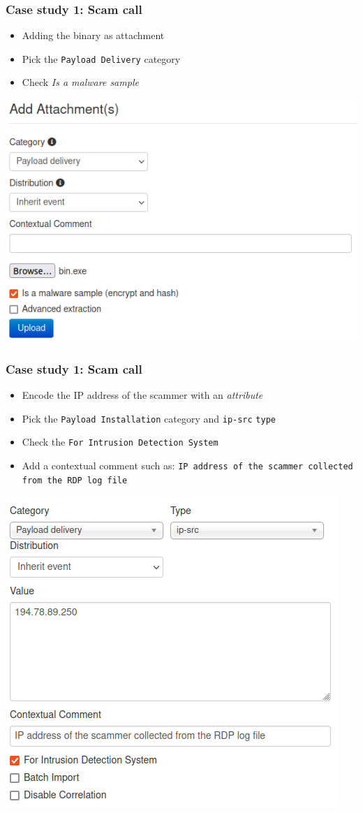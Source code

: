 \begin{frame}
    \frametitle{Case study 1: Scam call}
    \begin{itemize}
        \item Adding the binary as attachment
        \item Pick the \texttt{Payload Delivery} category
        \item Check \textit{Is a malware sample}
    \end{itemize}
    \begin{center}
        \includegraphics[width=0.80\linewidth]{pictures/case1/attribute-bin.png}
    \end{center}
\end{frame}

\begin{frame}
    \frametitle{Case study 1: Scam call}
    \begin{itemize}
        \item Encode the IP address of the scammer with an \textit{attribute}
        \item Pick the \texttt{Payload Installation} category and \texttt{ip-src}  \texttt{type}
        \item Check the \texttt{For Intrusion Detection System}
        \item Add a contextual comment such as: \texttt{IP address of the scammer collected from the RDP log file}
    \end{itemize}
    \begin{center}
        \includegraphics[width=0.70\linewidth]{pictures/case1/attribute-ip.png}
    \end{center}
\end{frame}

